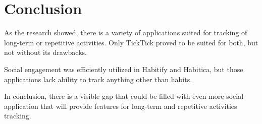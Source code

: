 
\section{Conclusion}\label{sec:conclusion}

As the research showed, there is a variety of applications suited for tracking of long-term or repetitive activities.
Only TickTick proved to be suited for both, but not without its drawbacks.

Social engagement was efficiently utilized in Habitify and Habitica,
but those applications lack ability to track anything other than habits.

In conclusion, there is a visible gap that could be filled with even more social application that will provide
features for long-term and repetitive activities tracking.